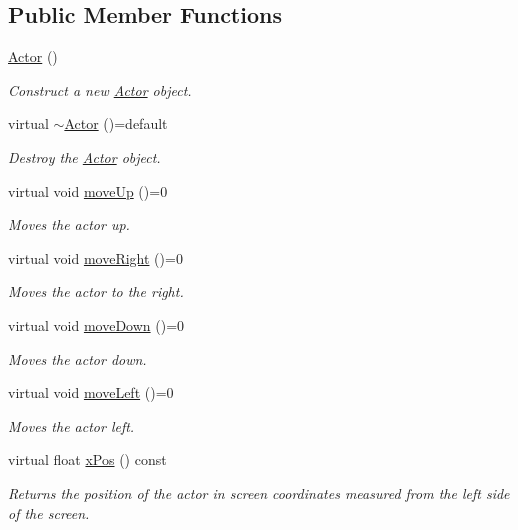 \subsection*{Public Member Functions}
\begin{DoxyCompactItemize}
\item 
\mbox{\hyperlink{classActor_a2a0ff4335a1ee9096df90f288c026c8b}{Actor}} ()
\begin{DoxyCompactList}\small\item\em Construct a new \mbox{\hyperlink{classActor}{Actor}} object. \end{DoxyCompactList}\item 
virtual \mbox{\hyperlink{classActor_a4e8d9d909ec2c3d3205682e83bf8ff18}{$\sim$\+Actor}} ()=default
\begin{DoxyCompactList}\small\item\em Destroy the \mbox{\hyperlink{classActor}{Actor}} object. \end{DoxyCompactList}\item 
virtual void \mbox{\hyperlink{classActor_afaa299f90233461ee4df96dcfda3008a}{move\+Up}} ()=0
\begin{DoxyCompactList}\small\item\em Moves the actor up. \end{DoxyCompactList}\item 
virtual void \mbox{\hyperlink{classActor_a9176d8f8ec68fcbd91c48223e7c65775}{move\+Right}} ()=0
\begin{DoxyCompactList}\small\item\em Moves the actor to the right. \end{DoxyCompactList}\item 
virtual void \mbox{\hyperlink{classActor_ad2737cd62ea0c96f75853afb5d1fd83a}{move\+Down}} ()=0
\begin{DoxyCompactList}\small\item\em Moves the actor down. \end{DoxyCompactList}\item 
virtual void \mbox{\hyperlink{classActor_a522d6069bacaa9985db7a234bde2c8b6}{move\+Left}} ()=0
\begin{DoxyCompactList}\small\item\em Moves the actor left. \end{DoxyCompactList}\item 
virtual float \mbox{\hyperlink{classActor_ab460c32c344963afcf476926367bd794}{x\+Pos}} () const
\begin{DoxyCompactList}\small\item\em Returns the position of the actor in screen coordinates measured from the left side of the screen. \end{DoxyCompactList}\item 

\end{DoxyCompactItemize}
